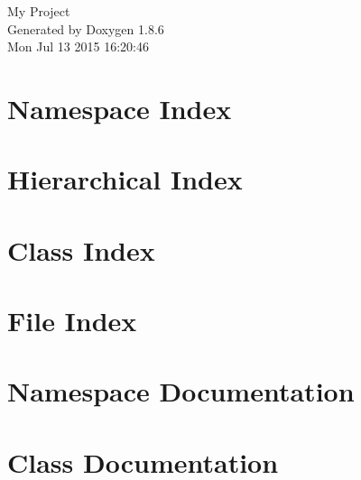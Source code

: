 \documentclass[twoside]{book}
\newcommand{\clearemptydoublepage}{%
  \newpage{\pagestyle{empty}\cleardoublepage}%
}
\begin{document}
\hypersetup{pageanchor=false}
\begin{titlepage}
\vspace*{7cm}
\begin{center}%
{\Large My Project }\\
\vspace*{1cm}
{\large Generated by Doxygen 1.8.6}\\
\vspace*{0.5cm}
{\small Mon Jul 13 2015 16:20:46}\\
\end{center}
\end{titlepage}
\clearemptydoublepage
\tableofcontents
\clearemptydoublepage
{}
\hypersetup{pageanchor=true}

\chapter{Namespace Index}

\chapter{Hierarchical Index}

\chapter{Class Index}

\chapter{File Index}

\chapter{Namespace Documentation}

\chapter{Class Documentation}




























\end{document}
